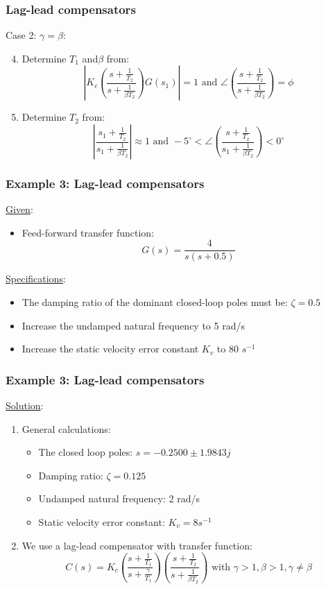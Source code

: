 \begin{frame}
	\frametitle{Lag-lead compensators}
	Case 2: $\gamma= \beta$:
	\begin{enumerate}
		\setcounter{enumi}{3}
		\item Determine $T_1$ and$\beta$ from:
		$$|K_c\left(\frac{s+\frac{1}{T_2}}{s+\frac{1}{\beta T_2}}\right)G(s_1)|=1 \text{ and } \angle\left(\frac{s+\frac{1}{T_2}}{s+\frac{1}{\beta T_2}}\right)=\phi$$
		\item Determine $T_2$ from:\\
		$$|\frac{s_1+\frac{1}{T_2}}{s_1+\frac{1}{\beta T_2}}|\approx 1 \text{ and } -5^{\circ}<\angle\left(\frac{s+\frac{1}{T_2}}{s_1+\frac{1}{\beta T_2}}\right)<0^{\circ}$$
	\end{enumerate}
\end{frame}

\begin{frame}
	\frametitle{Example 3: Lag-lead compensators}
	\underline{Given}:
	\begin{itemize}
		\item Feed-forward transfer function: $$G(s)=\frac{4}{s(s+0.5)}$$
	\end{itemize}
	\underline{Specifications}:
	\begin{itemize}
		\item The damping ratio of the dominant closed-loop poles must be: $\zeta=0.5$
		\item Increase the undamped natural frequency to 5 rad/s
		\item Increase the static velocity error constant $K_v$ to 80 $s^{-1}$
	\end{itemize}
\end{frame}

\begin{frame}
	\frametitle{Example 3: Lag-lead compensators}
	\underline{Solution}:
	\begin{enumerate}
		\item General calculations:
		\begin{itemize}
			\item The closed loop poles: $s=-0.2500\pm1.9843j$
			\item Damping ratio: $\zeta=0.125$
			\item Undamped natural frequency: 2 rad/s
			\item Static velocity error constant: $K_v=8s^{-1}$
		\end{itemize}
	\item We use a lag-lead compensator with transfer function:
	$$C(s)=K_c\left(\frac{s+\frac{1}{T_1}}{s+\frac{\gamma}{T_1}}\right)\left(\frac{s+\frac{1}{T_2}}{s+\frac{1}{\beta T_2}}\right) \text{ with } \gamma>1, \beta>1, \gamma\neq\beta$$
	\end{enumerate}
\end{frame}

